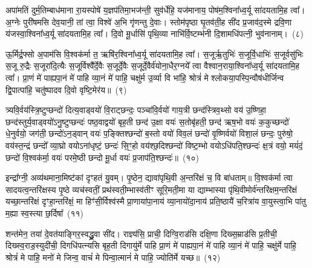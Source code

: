अपा॑मतिं दुर्म॒तिम्बाध॑माना रा॒यस्पोषे॑ य॒ज्ञप॑तिमा॒भज॑न्ती॒ सुव॑र्धेहि॒ यज॑मानाय॒ पोष॑म॒श्विना᳚ध्व॒र्यू सा॑दयतामि॒ह त्वा᳚। अ॒ग्नेः पुरी॑षमसि देव॒यानी॒ तां त्वा॒ विश्वे॑ अ॒भि गृ॑णन्तु दे॒वाः। स्तोम॑पृष्ठा घृ॒तव॑ती॒ह सी॑द प्र॒जाव॑द॒स्मे द्रवि॒णा य॑जस्वा॒श्विना᳚ध्व॒र्यू सा॑दयतामि॒ह त्वा᳚। दि॒वो मू॒र्धासि॑ पृथि॒व्या नाभि॑र्वि॒ष्टम्भ॑नी दि॒शामधि॑पत्नी॒ भुव॑नानाम्।~(८)

ऊ॒र्मिर्द्र॒फ्सो अ॒पाम॑सि वि॒श्वक॑र्मा त॒ ऋषि॑र॒श्विना᳚ध्व॒र्यू सा॑दयतामि॒ह त्वा᳚। स॒जूर्\mbox{}ऋ॒तुभिः॑ स॒जूर्वि॒धाभिः॑ स॒जूर्वसु॑भिः स॒जू रु॒द्रैः स॒जूरा॑दि॒त्यैः स॒जूर्विश्वै᳚र्दे॒वैः स॒जूर्दे॒वैः स॒जूर्दे॒वैर्व॑योना॒धैर॒ग्नये᳚ त्वा वैश्वान॒राया॒श्विना᳚ध्व॒र्यू सा॑दयतामि॒ह त्वा᳚। प्रा॒णं मे॑ पाह्यपा॒नं मे॑ पाहि व्या॒नं मे॑ पाहि॒ चक्षु॑र्म उ॒र्व्या वि भा॑हि॒ श्रोत्रं॑ मे श्लोकया॒पस्पि॒न्वौष॑धीर्जिन्व द्वि॒पात्पा॑हि॒ चतु॑ष्पादव दि॒वो वृष्टि॒मेर॑य॥~(९)

{\anuvakamend[{सु॒वीरं॒ भुव॑नानामु॒र्व्या स॒प्तद॑श च}]}%

त्र्यवि॒र्वय॑स्त्रि॒ष्टुप्छन्दो॑ दित्य॒वाड्वयो॑ वि॒राट्छन्दः॒ पञ्चा॑वि॒र्वयो॑ गाय॒त्री छन्द॑स्त्रिव॒थ्सो वय॑ उ॒ष्णिहा॒ छन्द॑स्तुर्य॒वाड्वयो॑\-ऽ\-नु॒ष्टुप्छन्दः॑ पष्ठ॒वाद्वयो॑ बृह॒ती छन्द॑ उ॒क्षा वयः॑ स॒तोबृ॑हती॒ छन्द॑ ऋष॒भो वयः॑ क॒कुच्छन्दो॑ धे॒नुर्वयो॒ जग॑ती॒ छन्दो॑\-ऽ\-न॒ड्वान् वयः॑ प॒ङ्क्तिश्छन्दो॑ ब॒स्तो वयो॑ विव॒लं छन्दो॑ वृ॒ष्णिर्वयो॑ विशा॒लं छन्दः॒ पुरु॑षो॒ वय॑स्त॒न्द्रं छन्दो᳚ व्या॒घ्रो वयो\-ऽ\-ना॑धृष्टं॒ छन्दः॑ सि॒ꣳ॒हो वय॑श्छ॒दिश्छन्दो॑ विष्ट॒म्भो वयो\-ऽधि॑पति॒श्छन्दः॑ क्ष॒त्रं वयो॒ मयं॑दं॒ छन्दो॑ वि॒श्वक॑र्मा॒ वयः॑ परमे॒ष्ठी छन्दो मू॒र्धा वयः॑ प्र॒जा\-प॑ति॒श्छन्दः॑॥~(१०)

{\anuvakamend[{पुरु॑षो॒ वयः॒ षड्विꣳ॑शतिश्च}]}%

इन्द्रा᳚ग्नी॒ अव्य॑थमाना॒मिष्ट॑कां दृꣳहतं यु॒वम्। पृ॒ष्ठेन॒ द्यावा॑पृथि॒वी अ॒न्तरि॑क्षं च॒ वि बा॑धताम्॥ वि॒श्वक॑र्मा त्वा सादयत्व॒न्तरि॑क्षस्य पृ॒ष्ठे व्यच॑स्वतीं॒ प्रथ॑स्वती॒म्भास्व॑तीꣳ सूरि॒मती॒मा या द्याम्भास्या पृ॑थि॒वीमोर्व॑न्तरि॑क्षम॒न्तरि॑क्षं यच्छा॒न्तरि॑क्षं दृꣳहा॒न्तरि॑क्षं॒ मा हिꣳ॑सी॒र्विश्व॑स्मै प्रा॒णाया॑पा॒नाय॑ व्या॒नायो॑दा॒नाय॑ प्रति॒ष्ठायै॑ च॒रित्रा॑य वा॒युस्त्वा॒भि पा॑तु म॒ह्या स्व॒स्त्या छ॒र्दिषा᳚~(११)

शन्त॑मेन॒ तया॑ दे॒वत॑याङ्गिर॒स्वद्ध्रु॒वा सी॑द। राज्ञ्य॑सि॒ प्राची॒ दिग्वि॒राड॑सि दक्षि॒णा दिख्स॒म्राड॑सि प्र॒तीची॒ दिख्स्व॒राड॒स्युदी॑ची॒ दिगधि॑पत्न्यसि बृह॒ती दिगायु॑र्मे पाहि प्रा॒णं मे॑ पाह्यपा॒नं मे॑ पाहि व्या॒नं मे॑ पाहि॒ चक्षु॑र्मे पाहि॒ श्रोत्रं॑ मे पाहि॒ मनो॑ मे जिन्व॒ वाचं॑ मे पिन्वा॒त्मानं॑ मे पाहि॒ ज्योति॑र्मे यच्छ॥~(१२)

